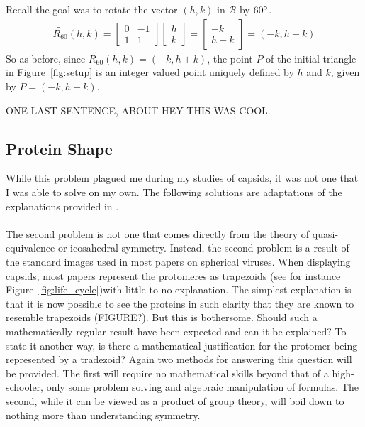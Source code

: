 \documentclass[12pt,letter]{article}
\begin{document}
%
Recall the goal was to rotate the vector $(h,k)$ in $\mathcal{B}$ by $60\degree$. 
%
\begin{align*}
	\widetilde{R_{60}}(h,k) =
	\begin{bmatrix}
		0 & -1 \\
		1 & 1
	\end{bmatrix}
	\begin{bmatrix}
		h \\ k
	\end{bmatrix} = 
	\begin{bmatrix}
		-k \\ h + k
	\end{bmatrix} =
	(-k , h + k)
\end{align*}
So as before, since $\widetilde{R_{60}}(h,k) = (-k , h + k)$, the point $P$ of the initial triangle in Figure~\ref{fig:setup} is an integer valued point uniquely defined by $h$ and $k$, given by $P = (-k , h + k)$.

ONE LAST SENTENCE, ABOUT HEY THIS WAS COOL.
\subsection{Protein Shape}
While this problem plagued me during my studies of capsids, it was not one that I was able to solve on my own. The following solutions are adaptations of the explanations provided in \cite[p 5-7]{Mannige:2009}.
\paragraph{}
The second problem is not one that comes directly from the theory of quasi-equivalence or icosahedral symmetry. Instead, the second problem is a result of the standard images used in most papers on spherical viruses. When displaying capsids, most papers represent the protomeres as trapezoids (see for instance Figure~\ref{fig:life_cycle})with little to no explanation. The simplest explanation is that it is now possible to see the proteins in such clarity that they are known to resemble trapezoids (FIGURE?). But this is bothersome. Should such a mathematically regular result have been expected and can it be explained? To state it another way, is there a mathematical justification for the protomer being represented by a tradezoid? Again two methods for answering this question will be provided. The first will require no mathematical skills beyond that of a high-schooler, only some problem solving and algebraic manipulation of formulas. The second, while it can be viewed as a product of group theory, will boil down to nothing more than understanding symmetry.
\end{document}
